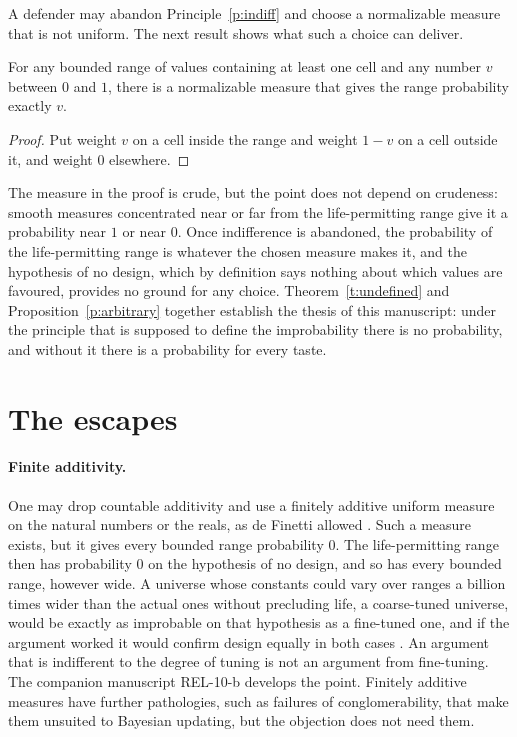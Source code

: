 \documentclass{situationist-preprint}
\begin{document}
A defender may abandon Principle~\ref{p:indiff} and choose a normalizable measure that is not uniform. The next result shows what such a choice can deliver.

\begin{proposition}\label{p:arbitrary}
For any bounded range of values containing at least one cell and any number $v$ between $0$ and $1$, there is a normalizable measure that gives the range probability exactly $v$.
\end{proposition}

\begin{proof}
Put weight $v$ on a cell inside the range and weight $1 - v$ on a cell outside it, and weight $0$ elsewhere.
\end{proof}

The measure in the proof is crude, but the point does not depend on crudeness: smooth measures concentrated near or far from the life-permitting range give it a probability near $1$ or near $0$. Once indifference is abandoned, the probability of the life-permitting range is whatever the chosen measure makes it, and the hypothesis of no design, which by definition says nothing about which values are favoured, provides no ground for any choice. Theorem~\ref{t:undefined} and Proposition~\ref{p:arbitrary} together establish the thesis of this manuscript: under the principle that is supposed to define the improbability there is no probability, and without it there is a probability for every taste.

\section{The escapes}

\paragraph{Finite additivity.} One may drop countable additivity and use a finitely additive uniform measure on the natural numbers or the reals, as de Finetti allowed \citep{deFinetti1974}. Such a measure exists, but it gives every bounded range probability $0$. The life-permitting range then has probability $0$ on the hypothesis of no design, and so has every bounded range, however wide. A universe whose constants could vary over ranges a billion times wider than the actual ones without precluding life, a coarse-tuned universe, would be exactly as improbable on that hypothesis as a fine-tuned one, and if the argument worked it would confirm design equally in both cases \citep{McGrewMcGrewVestrup2001,ColyvanGarfieldPriest2005}. An argument that is indifferent to the degree of tuning is not an argument from fine-tuning. The companion manuscript REL-10-b develops the point. Finitely additive measures have further pathologies, such as failures of conglomerability, that make them unsuited to Bayesian updating, but the objection does not need them.
\end{document}
